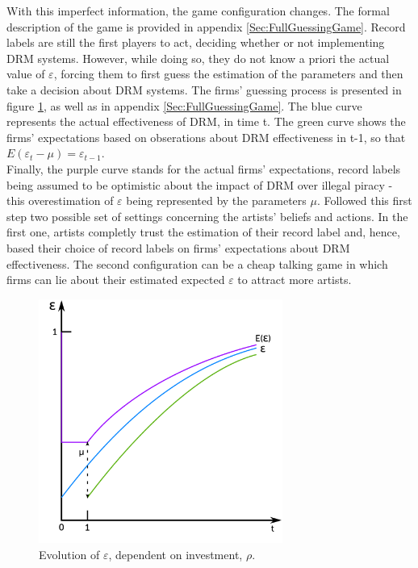 \documentclass[a4paper,12pt]{article}
\numberwithin{equation}{section}
\begin{document}
With this imperfect information, the game configuration changes. The
formal description of the game is provided in appendix \ref{Sec:FullGuessingGame}. Record labels
are still the first players to act, deciding whether or not implementing
DRM systems. However, while doing so, they do not know a priori the
actual value of $\varepsilon$, forcing them to first guess the estimation
of the parameters and then take a decision about DRM systems. The
firms' guessing process is presented in figure \ref{Fig:EpsilonGuessing}, as well as in appendix \ref{Sec:FullGuessingGame}.
The blue curve represents the actual effectiveness of DRM, in time
t. The green curve shows the firms' expectations based on obserations
about DRM effectiveness in t-1, so that $E(\varepsilon_{t}-\mu)=\varepsilon_{t-1}$.\\

Finally, the purple curve stands for the actual firms' expectations,
record labels being assumed to be optimistic about the impact of DRM
over illegal piracy - this overestimation of $\varepsilon$ being
represented by the parameters $\mu$. Followed this first step two
possible set of settings concerning the artists' beliefs and actions.
In the first one, artists completly trust the estimation of their
record label and, hence, based their choice of record labels on firms'
expectations about DRM effectiveness. The second configuration can
be a cheap talking game in which firms can lie about their estimated
expected $\varepsilon$ to attract more artists.\\

\begin{figure}[h!]
\centering
\includegraphics[width=8cm]{Graphics/graph2.pdf}
\caption{Evolution of $\varepsilon$, dependent on investment, $\rho$.}
\label{Fig:EpsilonGuessing}
\end{figure}
\end{document}
